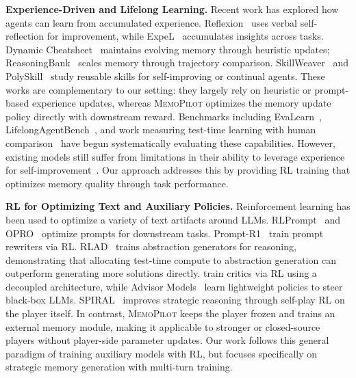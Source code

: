 \documentclass{article}
\newcommand{\methodname}{MemoPilot}
\newcommand{\method}{\textsc{\methodname}}
\theoremstyle{plain}
\theoremstyle{definition}
\theoremstyle{remark}
\begin{document}
\textbf{Experience-Driven and Lifelong Learning.}
Recent work has explored how agents can learn from accumulated experience. Reflexion~\citep{shinn2024reflexion} uses verbal self-reflection for improvement, while ExpeL~\citep{zhao2024expel} accumulates insights across tasks. Dynamic Cheatsheet~\citep{suzgun2025dynamic} maintains evolving memory through heuristic updates; ReasoningBank~\citep{ouyang2026reasoningbank} scales memory through trajectory comparison. SkillWeaver~\citep{skillweaver2025} and PolySkill~\citep{yu2026polyskilllearninggeneralizableskills} study reusable skills for self-improving or continual agents. These works are complementary to our setting: they largely rely on heuristic or prompt-based experience updates, whereas \method{} optimizes the memory update policy directly with downstream reward. Benchmarks including EvaLearn~\citep{dou2025evalearnquantifyinglearningcapability}, LifelongAgentBench~\citep{lifelongagentbench2025}, and work measuring test-time learning with human comparison~\citep{ttlhuman2025} have begun systematically evaluating these capabilities. However, existing models still suffer from limitations in their ability to leverage experience for self-improvement~\citep{huang2024largelanguagemodelsselfcorrect,dou2025evalearnquantifyinglearningcapability, suzgun2025dynamic}. Our approach addresses this by providing RL training that optimizes memory quality through task performance.

\textbf{RL for Optimizing Text and Auxiliary Policies.}
Reinforcement learning has been used to optimize a variety of text artifacts around LLMs. RLPrompt~\citep{deng2022rlprompt} and OPRO~\citep{yang2024opro} optimize prompts for downstream tasks. Prompt-R1~\citep{promptr1_2025} train prompt rewriters via RL. RLAD~\citep{rlad2025} trains abstraction generators for reasoning, demonstrating that allocating test-time compute to abstraction generation can outperform generating more solutions directly. \citet{xie2025teachinglanguagemodelscritique} train critics via RL using a decoupled architecture, while Advisor Models~\citep{advisor2025} learn lightweight policies to steer black-box LLMs. SPIRAL~\citep{liu2026spiral} improves strategic reasoning through self-play RL on the player itself. In contrast, \method{} keeps the player frozen and trains an external memory module, making it applicable to stronger or closed-source players without player-side parameter updates. Our work follows this general paradigm of training auxiliary models with RL, but focuses specifically on strategic memory generation with multi-turn training.
\end{document}
